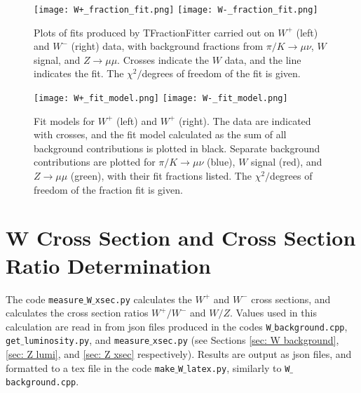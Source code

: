 \documentclass[a4paper]{article}
\begin{document}
\begin{figure}[h]
\centering
\texttt{[image: W+\_fraction\_fit.png]}
\texttt{[image: W-\_fraction\_fit.png]} 
\vspace{-4mm}
\caption{\small Plots of fits produced by TFractionFitter carried out on $W^+$ (left) and $W^-$ (right) data, with background fractions from $\pi/K \xrightarrow{} \mu\nu$, $W$ signal, and $Z \xrightarrow{} \mu\mu$. Crosses indicate the $W$ data, and the line indicates the fit. The $\chi^2/$degrees of freedom of the fit is given.}
\label{fig: W fraction fit}
\end{figure}

\begin{figure}[h]
\centering
\texttt{[image: W+\_fit\_model.png]}
\texttt{[image: W-\_fit\_model.png]} 
\vspace{-4mm}
\caption{\small Fit models for $W^+$ (left) and $W^+$ (right). The data are indicated with crosses, and the fit model calculated as the sum of all background contributions is plotted in black. Separate background contributions are plotted for $\pi/K \xrightarrow{} \mu\nu$ (blue), $W$ signal (red), and $Z \xrightarrow{} \mu\mu$ (green), with their fit fractions listed. The $\chi^2/$degrees of freedom of the fraction fit is given.}
\label{fig: W fit model}
\end{figure}


\section{W Cross Section and Cross Section Ratio Determination}
The code \texttt{measure$\_$W$\_$xsec.py} calculates the $W^+$ and $W^-$ cross sections, and calculates the cross section ratios $W^+/W^-$ and $W/Z$. Values used in this calculation are read in from json files produced in the codes \texttt{W$\_$background.cpp}, \texttt{get$\_$luminosity.py}, and \texttt{measure$\_$xsec.py} (see Sections \ref{sec: W background}, \ref{sec: Z lumi}, and \ref{sec: Z xsec} respectively). Results are output as json files, and formatted to a tex file in the code \texttt{make$\_$W$\_$latex.py}, similarly to \texttt{W$\_$background.cpp}.
\end{document}
